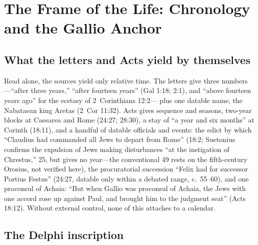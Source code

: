 \section{The Frame of the Life: Chronology and the Gallio Anchor}

\subsection{What the letters and Acts yield by themselves}

Read alone, the sources yield only relative time. The letters give three
numbers---``after three years,'' ``after fourteen years'' (Gal 1:18; 2:1),
and ``above fourteen years ago'' for the ecstasy of 2~Corinthians 12:2---
plus one datable name, the Nabataean king Aretas (2~Cor 11:32). Acts gives
sequence and seasons, two-year blocks at Caesarea and Rome (24:27; 28:30),
a stay of ``a year and six months'' at Corinth (18:11), and a handful of
datable officials and events: the edict by which ``Claudius had commanded
all Jews to depart from Rome'' (18:2; Suetonius confirms the expulsion of
Jews making disturbances ``at the instigation of Chrestus,'' 
25, but gives no year---the conventional 49 rests on the fifth-century
Orosius, not verified here), the
procuratorial succession ``Felix had for successor Portius Festus''
(24:27, datable only within a debated range, c.~55--60), and one proconsul
of Achaia: ``But when Gallio was proconsul of Achaia, the Jews with one
accord rose up against Paul, and brought him to the judgment seat'' (Acts
18:12). Without external control, none of this attaches to a calendar.

\subsection{The Delphi inscription}

